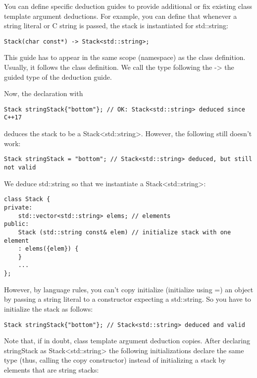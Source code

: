 You can define specific deduction guides to provide additional or fix existing class template argument deductions. For example, you can define that whenever a string literal or C string is passed, the stack is instantiated for std::string:

\begin{lstlisting}[style=styleCXX]
Stack(char const*) -> Stack<std::string>;
\end{lstlisting}

This guide has to appear in the same scope (namespace) as the class definition. Usually, it follows the class definition. We call the type following the -> the guided type of the deduction guide.

Now, the declaration with

\begin{lstlisting}[style=styleCXX]
Stack stringStack{"bottom"}; // OK: Stack<std::string> deduced since C++17
\end{lstlisting}

deduces the stack to be a Stack<std::string>. However, the following still doesn’t work:

\begin{lstlisting}[style=styleCXX]
Stack stringStack = "bottom"; // Stack<std::string> deduced, but still not valid
\end{lstlisting}

We deduce std::string so that we instantiate a Stack<std::string>:

\begin{lstlisting}[style=styleCXX]
class Stack {
private:
	std::vector<std::string> elems; // elements
public:
	Stack (std::string const& elem) // initialize stack with one element
	: elems({elem}) {
	}
	...
};
\end{lstlisting}

However, by language rules, you can’t copy initialize (initialize using =) an object by passing a string literal to a constructor expecting a std::string. So you have to initialize the stack as follows:

\begin{lstlisting}[style=styleCXX]
Stack stringStack{"bottom"}; // Stack<std::string> deduced and valid
\end{lstlisting}

Note that, if in doubt, class template argument deduction copies. After declaring stringStack as Stack<std::string> the following initializations declare the same type (thus, calling the copy constructor) instead of initializing a stack by elements that are string stacks:


